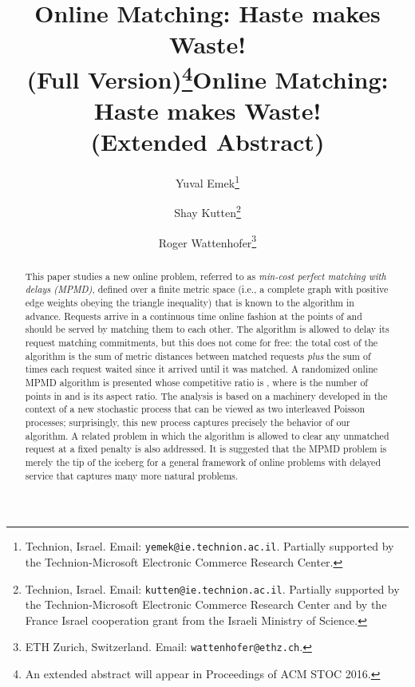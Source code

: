 \documentclass[11pt]{article}
\def\LongVersion{}
\def\LongVersionEnd{}
\def\ShortVersion{}
\def\ShortVersionEnd{}
\theoremstyle{definition}
\theoremstyle{plain}
\theoremstyle{definition}
\theoremstyle{plain}
\theoremstyle{definition}
\theoremstyle{plain}
\begin{document}
\LongVersion \title{Online Matching: Haste makes Waste! \\ (Full Version)\footnote{An extended abstract will appear in Proceedings of ACM STOC 2016.
}}
\LongVersionEnd \ShortVersion \title{Online Matching: Haste makes Waste! \\ (Extended Abstract)}
\ShortVersionEnd 

\date{}

\author{Yuval Emek\thanks{Technion, Israel.
Email: \texttt{yemek@ie.technion.ac.il}.
Partially supported by the Technion-Microsoft Electronic Commerce Research
Center.}
\and
Shay Kutten\thanks{Technion, Israel.
Email: \texttt{kutten@ie.technion.ac.il}.
Partially supported by the Technion-Microsoft Electronic Commerce Research
Center and by the France Israel cooperation grant from the Israeli Ministry of
Science.}
\and
Roger Wattenhofer\thanks{ETH Zurich, Switzerland.
Email: \texttt{wattenhofer@ethz.ch}.}
}

\begin{titlepage}

\maketitle

\begin{abstract}
This paper studies a new online problem, referred to as \emph{min-cost
perfect matching with delays (MPMD)}, defined over a finite metric
space (i.e., a complete graph with positive edge weights obeying
the triangle inequality)  that is known to the algorithm in
advance.
Requests arrive in a continuous time online fashion at the points of
 and should be served by matching them to each other.
The algorithm is allowed to delay its request matching commitments, but this
does not come for free:
the total cost of the algorithm is the sum of metric distances between matched
requests \emph{plus} the sum of times each request waited since it arrived
until it was matched.
A randomized online MPMD algorithm is presented whose competitive
ratio is
,
where  is the number of points in  and  is its aspect
ratio.
The analysis is based on a machinery developed in the context of a new
stochastic process that can be viewed as two interleaved Poisson processes;
surprisingly, this new process captures precisely the behavior of our
algorithm.
A related problem in which the algorithm is allowed to clear any unmatched
request at a fixed penalty is also addressed.
It is suggested that the MPMD problem is merely the tip of the iceberg for a
general framework of online problems with delayed service that captures
many more natural problems.
\end{abstract}

\renewcommand{\thepage}{}
\end{titlepage}
\end{document}

